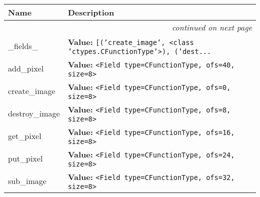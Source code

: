     \vspace{-1cm}
\hspace{\varindent}\begin{longtable}{|p{\varnamewidth}|p{\vardescrwidth}|l}
\cline{1-2}
\cline{1-2} \centering \textbf{Name} & \centering \textbf{Description}& \\
\cline{1-2}
\endhead\cline{1-2}\multicolumn{3}{r}{\small\textit{continued on next page}}\\\endfoot\cline{1-2}
\endlastfoot\raggedright \_\-f\-i\-e\-l\-d\-s\-\_\- & \raggedright \textbf{Value:} 
{\tt \texttt{[}\texttt{(}\texttt{'}\texttt{create\_image}\texttt{'}\texttt{, }{\textless}class 'ctypes.CFunctionType'{\textgreater}\texttt{)}\texttt{, }\texttt{(}\texttt{'}\texttt{dest}\texttt{...}}&\\
\cline{1-2}
\raggedright a\-d\-d\-\_\-p\-i\-x\-e\-l\- & \raggedright \textbf{Value:} 
{\tt {\textless}Field type=CFunctionType, ofs=40, size=8{\textgreater}}&\\
\cline{1-2}
\raggedright c\-r\-e\-a\-t\-e\-\_\-i\-m\-a\-g\-e\- & \raggedright \textbf{Value:} 
{\tt {\textless}Field type=CFunctionType, ofs=0, size=8{\textgreater}}&\\
\cline{1-2}
\raggedright d\-e\-s\-t\-r\-o\-y\-\_\-i\-m\-a\-g\-e\- & \raggedright \textbf{Value:} 
{\tt {\textless}Field type=CFunctionType, ofs=8, size=8{\textgreater}}&\\
\cline{1-2}
\raggedright g\-e\-t\-\_\-p\-i\-x\-e\-l\- & \raggedright \textbf{Value:} 
{\tt {\textless}Field type=CFunctionType, ofs=16, size=8{\textgreater}}&\\
\cline{1-2}
\raggedright p\-u\-t\-\_\-p\-i\-x\-e\-l\- & \raggedright \textbf{Value:} 
{\tt {\textless}Field type=CFunctionType, ofs=24, size=8{\textgreater}}&\\
\cline{1-2}
\raggedright s\-u\-b\-\_\-i\-m\-a\-g\-e\- & \raggedright \textbf{Value:} 
{\tt {\textless}Field type=CFunctionType, ofs=32, size=8{\textgreater}}&\\
\cline{1-2}
\end{longtable}



